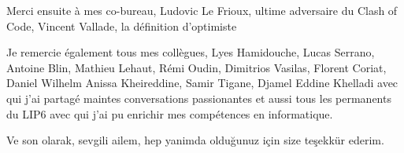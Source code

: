 Merci ensuite à mes co-bureau, Ludovic Le Frioux, ultime adversaire du Clash of Code,
Vincent Vallade, la définition d'optimiste

Je remercie également tous mes collègues, Lyes Hamidouche, Lucas Serrano, Antoine Blin,
Mathieu Lehaut, Rémi Oudin, Dimitrios Vasilas, Florent Coriat, Daniel Wilhelm
Anissa Kheireddine, Samir Tigane, Djamel Eddine Khelladi
 avec qui j’ai partagé maintes conversations passionantes 
 et aussi tous les permanents du LIP6 avec qui j'ai pu enrichir mes compétences en informatique.


Ve son olarak, sevgili ailem, hep yanimda olduğunuz için size teşekkür ederim.









